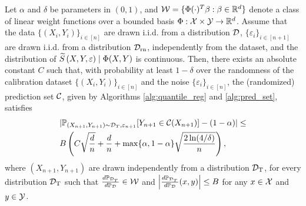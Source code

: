 

\begin{corollary}
\label{cor: distr-shift}
     Let $\alpha$ and $\delta$ be parameters in $(0,1)$, and ${\cal W} = \{\Phi(\cdot)^T \beta :\beta \in \mathbb{R}^d\}$ denote a class of linear weight functions over a bounded basis $\Phi : {\cal X} \times {\cal Y} \to \mathbb{R}^d$. Assume that the data $\{(X_i,Y_i)\}_{i\in [n]}$ are drawn \mbox{i.i.d.} from a distribution ${\cal D}$, $\{\varepsilon_i\}_{i\in [n+1]}$ are drawn \mbox{i.i.d.} from a distribution ${\cal D}_{\text{rn}}$, independently from the dataset, and the distribution of ${\widetilde{S}}\left(X,Y, \varepsilon\right) \mid \Phi(X,Y)$ is continuous. Then, there exists an absolute constant $C$ such that, with probability at least $1-\delta$ over the randomness of the calibration dataset $\{(X_i,Y_i)\}_{i\in [n]}$ and the noise $\{\varepsilon_i\}_{i \in [n]}$, the (randomized) prediction set ${\cal C}$, given by Algorithms \ref{alg:quantile_reg} and \ref{alg:pred_set}, satisfies
    \begin{align*}
        &|\mathbb{P}_{(X_{n+1}, Y_{n+1})\sim {\cal D}_T, \varepsilon_{n+1}} [Y_{n+1} \in {\cal C}(X_{n+1})] - (1-\alpha)|\leq \\
        &B \left( C \sqrt{\frac{d}{n}} + \frac{d}{n} +\max \{\alpha, 1-\alpha\}\sqrt{\frac{2\ln(4/\delta)}{n}}  \right) ,
    \end{align*}
     where $(X_{n+1},Y_{n+1})$ are drawn independently from a distribution ${\cal D}_{\text{T}}$, for every distribution ${\cal D}_{\text{T}}$ such that $\frac{d\mathbb{P}_{{\cal D}_{T}}}{d\mathbb{P}_{{\cal D}}} \in {\cal W}$ and $ \left|\frac{d\mathbb{P}_{{\cal D}_{T}}}{d\mathbb{P}_{{\cal D}}}(x,y) \right|\leq B$ for any $x \in {\cal X}$ and $y \in {\cal Y}$.  
\end{corollary}




